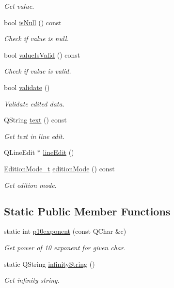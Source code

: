 \begin{DoxyCompactItemize}
\begin{DoxyCompactList}\small\item\em Get value. \end{DoxyCompactList}\item 
bool \hyperlink{classmdt_double_edit_a7b83fd56666d8c65b335ff07b06a7bcc}{is\-Null} () const 
\begin{DoxyCompactList}\small\item\em Check if value is null. \end{DoxyCompactList}\item 
bool \hyperlink{classmdt_double_edit_a530a3b818aba14e34636dc1ad36b9292}{value\-Is\-Valid} () const 
\begin{DoxyCompactList}\small\item\em Check if value is valid. \end{DoxyCompactList}\item 
bool \hyperlink{classmdt_double_edit_a65fb669b3572e31c056b9c55bb085485}{validate} ()
\begin{DoxyCompactList}\small\item\em Validate edited data. \end{DoxyCompactList}\item 
Q\-String \hyperlink{classmdt_double_edit_a169b321873e50e1e9bf2b15bbf12af78}{text} () const 
\begin{DoxyCompactList}\small\item\em Get text in line edit. \end{DoxyCompactList}\item 
Q\-Line\-Edit $\ast$ \hyperlink{classmdt_double_edit_a565de39a33c61d6707790d2519ea9c84}{line\-Edit} ()
\item 
\hyperlink{classmdt_double_edit_a52cc3f5b9d6acd6838c52d478b3ea4dd}{Edition\-Mode\-\_\-t} \hyperlink{classmdt_double_edit_a87b7f4d0a2ed14ba6e2d1b28cfbe9090}{edition\-Mode} () const 
\begin{DoxyCompactList}\small\item\em Get edition mode. \end{DoxyCompactList}\end{DoxyCompactItemize}
\subsection*{Static Public Member Functions}
\begin{DoxyCompactItemize}
\item 
static int \hyperlink{classmdt_double_edit_a95b27d762b1ea5635a30d68c97c77343}{p10exponent} (const Q\-Char \&c)
\begin{DoxyCompactList}\small\item\em Get power of 10 exponent for given char. \end{DoxyCompactList}\item 
static Q\-String \hyperlink{classmdt_double_edit_a09e6276d61dd02feea43e795417d8ea9}{infinity\-String} ()
\begin{DoxyCompactList}\small\item\em Get infinity string. \end{DoxyCompactList}\end{DoxyCompactItemize}
